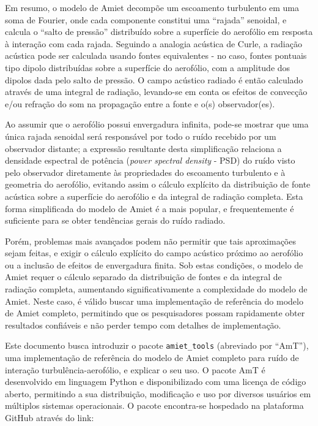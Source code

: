 \documentclass[a4paper, 11pt, twoside]{article}
\begin{document}
Em resumo, o modelo de Amiet decompõe um escoamento turbulento em uma soma de Fourier, onde cada componente constitui uma ``rajada'' senoidal, e calcula o ``salto de pressão'' distribuído sobre a superfície do aerofólio em resposta à interação com cada rajada. Seguindo a analogia acústica de Curle, a radiação acústica pode ser calculada usando fontes equivalentes - no caso, fontes pontuais tipo dipolo distribuídas sobre a superfície do aerofólio, com a amplitude dos dipolos dada pelo salto de pressão. O campo acústico radiado é então calculado através de uma integral de radiação, levando-se em conta os efeitos de convecção e/ou refração do som na propagação entre a fonte e o(s) observador(es).

Ao assumir que o aerofólio possui envergadura infinita, pode-se mostrar que uma única rajada senoidal será responsável por todo o ruído recebido por um observador distante; a expressão resultante desta simplificação relaciona a densidade espectral de potência (\emph{power spectral density} - PSD) do ruído visto pelo observador diretamente às propriedades do escoamento turbulento e à geometria do aerofólio, evitando assim o cálculo explícito da distribuição de fonte acústica sobre a superfície do aerofólio e da integral de radiação completa. Esta forma simplificada do modelo de Amiet é a mais popular, e frequentemente é suficiente para se obter tendências gerais do ruído radiado. 

Porém, problemas mais avançados podem não permitir que tais aproximações sejam feitas, e exigir o cálculo explícito do campo acústico próximo ao aerofólio ou a inclusão de efeitos de envergadura finita. Sob estas condições, o modelo de Amiet requer o cálculo separado da distribuição de fontes e da integral de radiação completa, aumentando significativamente a complexidade do modelo de Amiet. Neste caso, é válido buscar uma implementação de referência do modelo de Amiet completo, permitindo que os pesquisadores possam rapidamente obter resultados confiáveis e não perder tempo com detalhes de implementação.

Este documento busca introduzir o pacote \verb|amiet_tools| (abreviado por ``AmT''), uma implementação de referência do modelo de Amiet completo para ruído de interação turbulência-aerofólio, e explicar o seu uso. O pacote AmT é desenvolvido em linguagem Python e disponibilizado com uma licença de código aberto, permitindo a sua distribuição, modificação e uso por diversos usuários em múltiplos sistemas operacionais. O pacote encontra-se hospedado na plataforma GitHub através do link:
\end{document}
